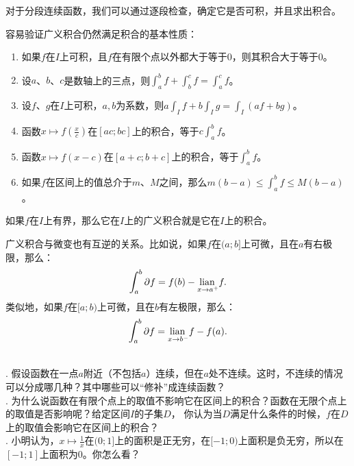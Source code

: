 \documentclass[12pt,UTF8]{ctexbook}
\begin{document}
对于分段连续函数，我们可以通过逐段检查，确定它是否可积，并且求出积合。

容易验证广义积合仍然满足积合的基本性质：
\begin{enumerate}
    \item 如果$f$在$I$上可积，且$f$在有限个点以外都大于等于$0$，则其积合大于等于$0$。
    \item 设$a$、$b$、$c$是数轴上的三点，则$\int_a^b f + \int_b^c f = \int_a^c f$。
    \item 设$f$、$g$在$I$上可积，$a, b$为系数，则$ a \int_I f + b \int_I g = \int_I (af + bg) $。
    \item 函数$x\mapsto f\left(\frac{x}{c}\right)$在$[ac; bc]$上的积合，等于$c\int_a^b f$。
    \item 函数$x\mapsto f(x-c)$在$[a+c;b+c]$上的积合，等于$\int_a^b f$。
    \item 如果$f$在区间上的值总介于$m$、$M$之间，那么$m(b - a) \leqslant \int_a^b f \leqslant M(b - a)$。
\end{enumerate}

如果$f$在$I$上有界，那么它在$I$上的广义积合就是它在$I$上的积合。

广义积合与微变也有互逆的关系。比如说，如果$f$在$(a;b]$上可微，且在$a$有右极限，那么：
$$ \int_a^b \partial f = f(b) - \underset{x\to a^+}{\operatorname{lian}\,} f.$$
类似地，如果$f$在$[a;b)$上可微，且在$b$有左极限，那么：
$$ \int_a^b \partial f = \underset{x\to b^-}{\operatorname{lian}\,} f - f(a).$$

\begin{sk}
    \mbox{} \\
    . 假设函数在一点$a$附近（不包括$a$）连续，但在$a$处不连续。这时，不连续的情况可以分成哪几种？其中哪些可以“修补”成连续函数？\\
    . 为什么说函数在有限个点上的取值不影响它在区间上的积合？函数在无限个点上的取值是否影响呢？给定区间$I$的子集$D$，
    你认为当$D$满足什么条件的时候，$f$在$D$上的取值会影响它在区间上的积合？\\
    . 小明认为，$x\mapsto\frac{1}{x}$在$(0;1]$上的面积是正无穷，在$[-1;0)$上面积是负无穷，所以在$[-1;1]$上面积为$0$。你怎么看？
\end{sk}
\end{document}
